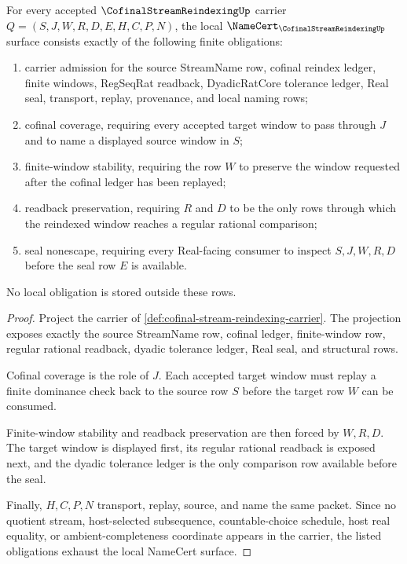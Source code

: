 \begin{theorem}
\label{thm:cofinal-stream-reindexing-namecert-obligations}
For every accepted $\CofinalStreamReindexingUp$ carrier $Q=(S,J,W,R,D,E,H,C,P,N)$, the local $\NameCert_{\CofinalStreamReindexingUp}$ surface consists exactly of the following finite obligations:
\begin{enumerate}
\item carrier admission for the source StreamName row, cofinal reindex ledger, finite windows, RegSeqRat readback, DyadicRatCore tolerance ledger, Real seal, transport, replay, provenance, and local naming rows;
\item cofinal coverage, requiring every accepted target window to pass through $J$ and to name a displayed source window in $S$;
\item finite-window stability, requiring the row $W$ to preserve the window requested after the cofinal ledger has been replayed;
\item readback preservation, requiring $R$ and $D$ to be the only rows through which the reindexed window reaches a regular rational comparison;
\item seal nonescape, requiring every Real-facing consumer to inspect $S,J,W,R,D$ before the seal row $E$ is available.
\end{enumerate}
No local obligation is stored outside these rows.
\end{theorem}
\begin{proof}
Project the carrier of \autoref{def:cofinal-stream-reindexing-carrier}. The projection exposes exactly the source StreamName row, cofinal ledger, finite-window row, regular rational readback, dyadic tolerance ledger, Real seal, and structural rows.

Cofinal coverage is the role of $J$. Each accepted target window must replay a finite dominance check back to the source row $S$ before the target row $W$ can be consumed.

Finite-window stability and readback preservation are then forced by $W,R,D$. The target window is displayed first, its regular rational readback is exposed next, and the dyadic tolerance ledger is the only comparison row available before the seal.

Finally, $H,C,P,N$ transport, replay, source, and name the same packet. Since no quotient stream, host-selected subsequence, countable-choice schedule, host real equality, or ambient-completeness coordinate appears in the carrier, the listed obligations exhaust the local NameCert surface.
\end{proof}

